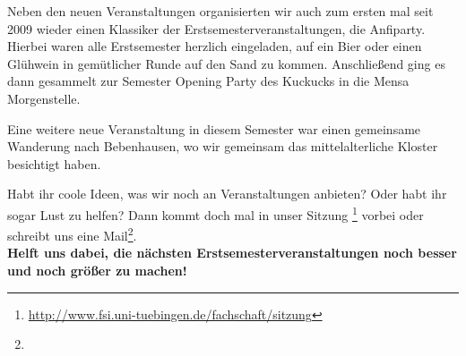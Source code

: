 Neben den neuen Veranstaltungen organisierten wir auch zum ersten mal seit 2009 wieder einen Klassiker der Erstsemesterveranstaltungen, die Anfiparty. Hierbei waren alle Erstsemester herzlich eingeladen, auf ein Bier oder einen Glühwein in gemütlicher Runde auf den Sand zu kommen. Anschließend ging es dann gesammelt zur Semester Opening Party des Kuckucks in die Mensa Morgenstelle.
%

Eine weitere neue Veranstaltung in diesem Semester war einen gemeinsame Wanderung nach Bebenhausen, wo wir gemeinsam das mittelalterliche Kloster besichtigt haben.


Habt ihr coole Ideen, was wir noch an Veranstaltungen anbieten? Oder habt ihr sogar Lust zu helfen? Dann kommt doch mal in unser Sitzung \footnote{\url{http://www.fsi.uni-tuebingen.de/fachschaft/sitzung}} vorbei oder schreibt uns eine Mail\footnote{}.\\ \textbf{Helft uns dabei, die nächsten Erstsemesterveranstaltungen noch besser und noch größer zu machen!}